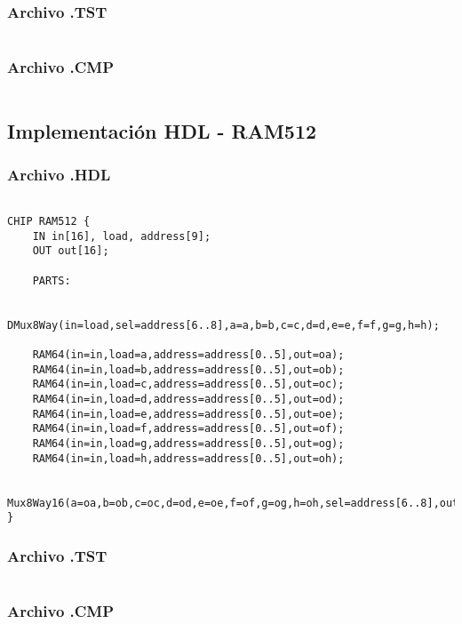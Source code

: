 \documentclass[12pt]{article}
\begin{document}
        \subsubsection{Archivo .TST}
        \begin{lstlisting}

        \end{lstlisting}
        \subsubsection{Archivo .CMP}
        \begin{lstlisting}

        \end{lstlisting}

   \subsection{Implementación HDL - RAM512}

  	\subsubsection{Archivo .HDL}
  	\begin{lstlisting}

CHIP RAM512 {
	IN in[16], load, address[9];
	OUT out[16];

	PARTS:

	DMux8Way(in=load,sel=address[6..8],a=a,b=b,c=c,d=d,e=e,f=f,g=g,h=h);

	RAM64(in=in,load=a,address=address[0..5],out=oa);
	RAM64(in=in,load=b,address=address[0..5],out=ob);
	RAM64(in=in,load=c,address=address[0..5],out=oc);
	RAM64(in=in,load=d,address=address[0..5],out=od);
	RAM64(in=in,load=e,address=address[0..5],out=oe);
	RAM64(in=in,load=f,address=address[0..5],out=of);
	RAM64(in=in,load=g,address=address[0..5],out=og);
	RAM64(in=in,load=h,address=address[0..5],out=oh);

	Mux8Way16(a=oa,b=ob,c=oc,d=od,e=oe,f=of,g=og,h=oh,sel=address[6..8],out=out);
}

  	\end{lstlisting}
  	\subsubsection{Archivo .TST}
  	\begin{lstlisting}

  	\end{lstlisting}
  	\subsubsection{Archivo .CMP}
  	\begin{lstlisting}

  	\end{lstlisting}
\end{document}
